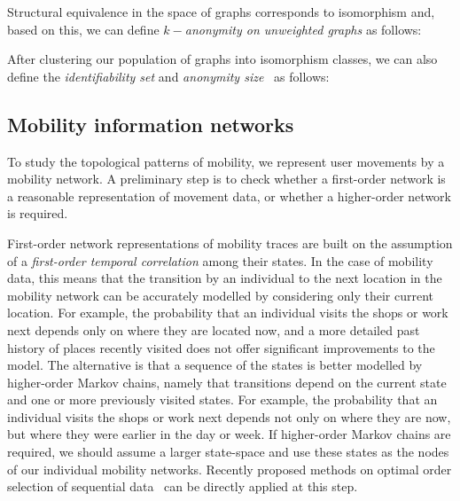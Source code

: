 Structural equivalence in the space of graphs corresponds to isomorphism and, based on this, we can define \emph{$k-$anonymity on unweighted graphs} as follows:



\vspace{.4cm}
After clustering our population of graphs into isomorphism classes, we can also define the \emph{identifiability set} and \emph{anonymity size}~\citep{anon_terminology} as follows:



\subsection{Mobility information networks\label{sec:mobility-networks}}

To study the topological patterns of mobility, we represent user movements by a mobility network.
A preliminary step is to check whether a first-order network is a reasonable representation of movement data, or whether a higher-order network is required.

First-order network representations of mobility traces are built on the assumption of a \emph{first-order temporal correlation} among their states.
In the case of mobility data, this means that the transition by an individual to the next location in the mobility network can be accurately modelled by considering only their current location.
For example, the probability that an individual visits the shops or work next depends only on where they are located now, and a more detailed past history of places recently visited does not offer significant improvements to the model.
The alternative is that a sequence of the states is better modelled by higher-order Markov chains, namely that transitions depend on the current state and one or more previously visited states.
For example, the probability that an individual visits the shops or work next depends not only on where they are now, but where they were earlier in the day or week.
If higher-order Markov chains are required, we should assume a larger state-space and use these states as the nodes of our individual mobility networks.
Recently proposed methods on optimal order selection of sequential data~\citep{xu2016representing, scholtes2017network} can be directly applied at this step.

